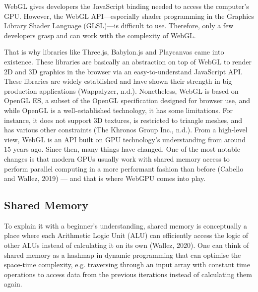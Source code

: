 \documentclass[10pt]{article}
\begin{document}
\begin{sloppypar}
  WebGL gives developers the JavaScript binding needed to access the computer’s GPU. However, the WebGL API—especially shader programming in the Graphics Library Shader Language (GLSL)—is difficult to use. Therefore, only a few developers grasp and can work with the complexity of WebGL.

  That is why libraries like Three.js, Babylon.js and Playcanvas came into existence. These libraries are basically an abstraction on top of WebGL to render 2D and 3D graphics in the browser via an easy-to-understand JavaScript API. These libraries are widely established and have shown their strength in big production applications (Wappalyzer, n.d.). Nonetheless, WebGL is based on OpenGL ES, a subset of the OpenGL specification designed for browser use, and while OpenGL is a well-established technology, it has some limitations. For instance, it does not support 3D textures, is restricted to triangle meshes, and has various other constraints (The Khronos Group Inc., n.d.). From a high-level view, WebGL is an API built on GPU technology’s understanding from around 15 years ago. Since then, many things have changed. One of the most notable changes is that modern GPUs usually work with shared memory access to perform parallel computing in a more performant fashion than before (Cabello and Wallez, 2019) — and that is where WebGPU comes into play.

  \subsection{Shared Memory}
  \label{subsec:shared-memory}

  To explain it with a beginner’s understanding, shared memory is conceptually a place where each Arithmetic Logic Unit (ALU) can efficiently access the logic of other ALUs instead of calculating it on its own (Wallez, 2020). One can think of shared memory as a hashmap in dynamic programming that can optimise the space-time complexity, e.g. traversing through an input array with constant time operations to access data from the previous iterations instead of calculating them again.


\end{sloppypar}
\end{document}
